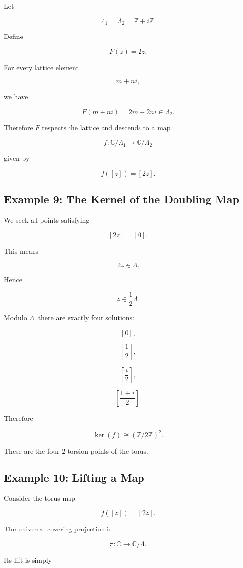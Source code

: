 \documentclass[12pt,a4paper]{article}
\theoremstyle{notespace}
\begin{document}
Let

\[
\Lambda_1
=
\Lambda_2
=
\mathbb Z+i\mathbb Z.
\]

Define

\[
F(z)=2z.
\]

For every lattice element

\[
m+ni,
\]

we have

\[
F(m+ni)
=
2m+2ni
\in
\Lambda_2.
\]

Therefore \(F\) respects the lattice and descends to a map

\[
f:\mathbb C/\Lambda_1
\longrightarrow
\mathbb C/\Lambda_2
\]

given by

\[
f([z])
=
[2z].
\]

\subsection{Example 9: The Kernel of the Doubling Map}

We seek all points satisfying

\[
[2z]
=
[0].
\]

This means

\[
2z
\in
\Lambda.
\]

Hence

\[
z
\in
\frac12\Lambda.
\]

Modulo \(\Lambda\), there are exactly four solutions:

\[
[0],
\]

\[
\left[\frac12\right],
\]

\[
\left[\frac{i}{2}\right],
\]

\[
\left[\frac{1+i}{2}\right].
\]

Therefore

\[
\ker(f)
\cong
(\mathbb Z/2\mathbb Z)^2.
\]

These are the four \(2\)-torsion points of the torus.

\subsection{Example 10: Lifting a Map}

Consider the torus map

\[
f([z])
=
[2z].
\]

The universal covering projection is

\[
\pi:\mathbb C\to\mathbb C/\Lambda.
\]

Its lift is simply
\end{document}

